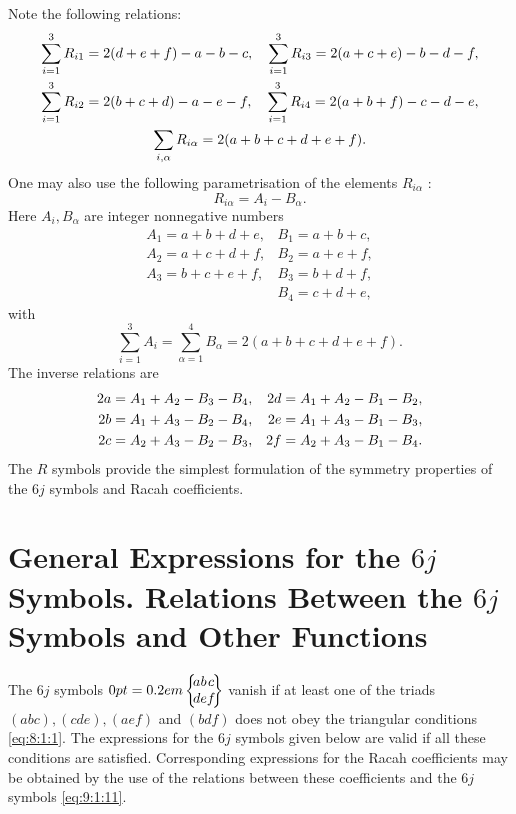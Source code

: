 Note the following relations:
\begin{gather}
\sum_{i=1}^{3} R_{i 1}=2(d+e+f)-a-b-c, \quad \sum_{i=1}^{3} R_{i 3}=2(a+c+e)-b-d-f,  \notag\\
\sum_{i=1}^{3} R_{i 2}=2(b+c+d)-a-e-f, \quad \sum_{i=1}^{3} R_{i 4}=2(a+b+f)-c-d-e,  \label{eq:9:1:16}\\
\sum_{i, \alpha} R_{i \alpha}=2(a+b+c+d+e+f) . \notag
\end{gather}
One may also use the following parametrisation of the elements $R_{i \alpha}$ \cite{ref045}:
\begin{equation}
R_{i \alpha}=A_{i}-B_{\alpha} . \label{eq:9:1:17}
\end{equation}
Here $A_{i}, B_{\alpha}$ are integer nonnegative numbers
\begin{equation}
\begin{array}{ll}
A_{1}=a+b+d+e, & B_{1}=a+b+c,  \\
A_{2}=a+c+d+f, & B_{2}=a+e+f, \\
A_{3}=b+c+e+f, & B_{3}=b+d+f, \\
& B_{4}=c+d+e, \label{eq:9:1:18}
\end{array}
\end{equation}
with
\begin{equation}
\sum_{i=1}^{3} A_{i}=\sum_{\alpha=1}^{4} B_{\alpha}=2(a+b+c+d+e+f). \label{eq:9:1:19}
\end{equation}
The inverse relations are
\begin{align}
2 a & =A_{1}+A_{2}-B_{3}-B_{4}, & 2 d & =A_{1}+A_{2}-B_{1}-B_{2},  \notag\\
2 b & =A_{1}+A_{3}-B_{2}-B_{4}, & 2 e & =A_{1}+A_{3}-B_{1}-B_{3},  \notag\\
2 c & =A_{2}+A_{3}-B_{2}-B_{3}, & 2 f & =A_{2}+A_{3}-B_{1}-B_{4} . \label{eq:9:1:20}
\end{align}
The $R$ symbols provide the simplest formulation of the symmetry properties of the $6 j$ symbols and Racah coefficients.

\section{General Expressions for the $6 j$ Symbols. Relations Between the $6 j$ Symbols and Other Functions}\label{sec:9.2}
The $6 j$ symbols $\sixj{a}{b}{c}{d}{e}{f}$ vanish if at least one of the triads $(a b c),(c d e),(a e f)$ and $(b d f)$ does not obey the triangular conditions \eqref{eq:8:1:1}. The expressions for the $6 j$ symbols given below are valid if all these conditions are satisfied. Corresponding expressions for the Racah coefficients may be obtained by the use of the relations between these coefficients and the $6 j$ symbols \eqref{eq:9:1:11}.

